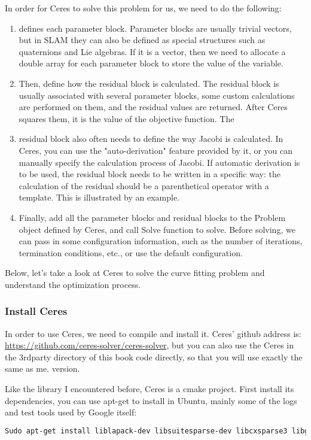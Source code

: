 In order for Ceres to solve this problem for us, we need to do the following:
\begin{enumerate}
\item defines each parameter block. Parameter blocks are usually trivial vectors, but in SLAM they can also be defined as special structures such as quaternions and Lie algebras. If it is a vector, then we need to allocate a double array for each parameter block to store the value of the variable.
\item Then, define how the residual block is calculated. The residual block is usually associated with several parameter blocks, some custom calculations are performed on them, and the residual values ​​are returned. After Ceres squares them, it is the value of the objective function.
The \item residual block also often needs to define the way Jacobi is calculated. In Ceres, you can use the "auto-derivation" feature provided by it, or you can manually specify the calculation process of Jacobi. If automatic derivation is to be used, the residual block needs to be written in a specific way: the calculation of the residual should be a parenthetical operator with a template. This is illustrated by an example.
\item Finally, add all the parameter blocks and residual blocks to the Problem object defined by Ceres, and call Solve function to solve. Before solving, we can pass in some configuration information, such as the number of iterations, termination conditions, etc., or use the default configuration.
\end{enumerate}
Below, let's take a look at Ceres to solve the curve fitting problem and understand the optimization process.

\subsubsection{Install Ceres}
In order to use Ceres, we need to compile and install it. Ceres' github address is: \url{https://github.com/ceres-solver/ceres-solver}, but you can also use the Ceres in the 3rdparty directory of this book code directly, so that you will use exactly the same as me. version.

Like the library I encountered before, Ceres is a cmake project. First install its dependencies, you can use apt-get to install in Ubuntu, mainly some of the logs and test tools used by Google itself:
\begin{lstlisting}[language=sh,caption=terminal input:]
Sudo apt-get install liblapack-dev libsuitesparse-dev libcxsparse3 libgflags-dev libgoogle-glog-dev libgtest-dev
\end{lstlisting}

